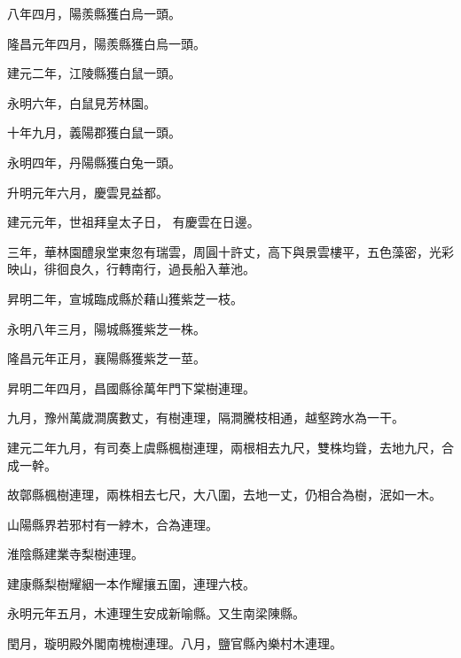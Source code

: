 \begin{pinyinscope}
 八年四月，陽羨縣獲白烏一頭。



 隆昌元年四月，陽羨縣獲白烏一頭。



 建元二年，江陵縣獲白鼠一頭。



 永明六年，白鼠見芳林園。



 十年九月，義陽郡獲白鼠一頭。



 永明四年，丹陽縣獲白兔一頭。



 升明元年六月，慶雲見益都。



 建元元年，世祖拜皇太子日，
 有慶雲在日邊。



 三年，華林園醴泉堂東忽有瑞雲，周圓十許丈，高下與景雲樓平，五色藻密，光彩映山，徘徊良久，行轉南行，過長船入華池。



 昇明二年，宣城臨成縣於藉山獲紫芝一枝。



 永明八年三月，陽城縣獲紫芝一株。



 隆昌元年正月，襄陽縣獲紫芝一莖。



 昇明二年四月，昌國縣徐萬年門下棠樹連理。



 九月，豫州萬歲澗廣數丈，有樹連理，隔澗騰枝相通，越壑跨水為一干。



 建元二年九月，有司奏上虞縣楓樹連理，兩根相去九尺，雙株均聳，去地九尺，合成一幹。



 故鄣縣楓樹連理，兩株相去七尺，大八圍，去地一丈，仍相合為樹，泯如一木。



 山陽縣界若邪村有一綍木，合為連理。



 淮陰縣建業寺梨樹連理。



 建康縣梨樹耀絪一本作耀攘五圍，連理六枝。



 永明元年五月，木連理生安成新喻縣。又生南梁陳縣。



 閏月，璇明殿外閣南槐樹連理。八月，鹽官縣內樂村木連理。




\end{pinyinscope}
